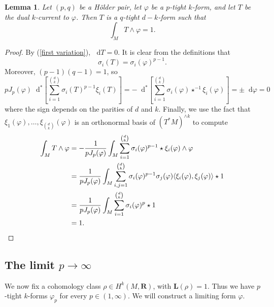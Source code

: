 \documentclass[reqno,11pt]{amsart}
\newcommand{\RR}{\mathbf{R}}
\newcommand*\dif{\mathop{}\!\mathrm{d}}
\newcommand{\Comass}{\mathbf L}
\newtheorem{lemma}[theorem]{Lemma}
\theoremstyle{definition}
\numberwithin{equation}{section}
\begin{document}
\begin{lemma}
Let $(p, q)$ be a H\"older pair, let $\varphi$ be a $p$-tight $k$-form, and let $T$ be the dual $k$-current to $\varphi$.
Then $T$ is a $q$-tight $d - k$-form such that 
$$\int_M T \wedge \varphi = 1.$$
\end{lemma}
\begin{proof}
By (\ref{first variation}), $\dif T = 0$.
It is clear from the definitions that
$$\sigma_i(T) = \sigma_i(\varphi)^{p - 1}.$$
Moreover, $(p - 1)(q - 1) = 1$, so 
$$p J_p(\varphi) \dif^*\left[\sum_{i=1}^{\binom dk} \sigma_i(T)^{p - 1} \xi_i(T)\right] = -\dif^*\left[\sum_{i=1}^{\binom dk} \sigma_i(\varphi) \star^{-1} \xi_i(\varphi)\right] = \pm \dif \varphi = 0$$
where the sign depends on the parities of $d$ and $k$.
Finally, we use the fact that $\xi_1(\varphi), \dots, \xi_{\binom dk}(\varphi)$ is an orthonormal basis of $(T^* M)^{\wedge k}$ to compute
\begin{align*}
\int_M T \wedge \varphi
&= -\frac{1}{p J_p(\varphi)} \int_M \sum_{i=1}^{\binom dk} \sigma_i(\varphi)^{p - 1} \star \xi_i(\varphi) \wedge \varphi \\
&= \frac{1}{p J_p(\varphi)} \int_M \sum_{i,j=1}^{\binom dk} \sigma_i(\varphi)^{p - 1} \sigma_j(\varphi) \langle\xi_i(\varphi), \xi_j(\varphi)\rangle \star 1 \\
&= \frac{1}{p J_p(\varphi)} \int_M \sum_{i=1}^{\binom dk} \sigma_i(\varphi)^p \star 1 \\
&= 1. \qedhere 
\end{align*}
\end{proof}

\subsection{The limit \texorpdfstring{$p \to \infty$}{p to infinity}}
We now fix a cohomology class $\rho \in H^k(M, \RR)$, with $\Comass(\rho) = 1$.
Thus we have $p$-tight $k$-forms $\varphi_p$ for every $p \in (1, \infty)$.
We will construct a limiting form $\varphi$.
\end{document}
